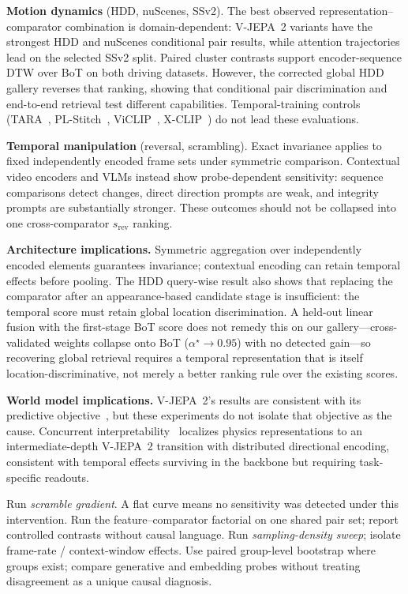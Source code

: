 \documentclass{article}
\theoremstyle{remark}
\begin{document}
\textbf{Motion dynamics} (HDD, nuScenes, SSv2). The best observed representation--comparator combination is domain-dependent: V-JEPA~2 variants have the strongest HDD and nuScenes conditional pair results, while attention trajectories lead on the selected SSv2 split. Paired cluster contrasts support encoder-sequence DTW over BoT on both driving datasets. However, the corrected global HDD gallery reverses that ranking, showing that conditional pair discrimination and end-to-end retrieval test different capabilities. Temporal-training controls (TARA~\cite{tara}, PL-Stitch~\cite{plstitch}, ViCLIP~\cite{viclip}, X-CLIP~\cite{xclip}) do not lead these evaluations.

\textbf{Temporal manipulation} (reversal, scrambling). Exact invariance applies to fixed independently encoded frame sets under symmetric comparison. Contextual video encoders and VLMs instead show probe-dependent sensitivity: sequence comparisons detect changes, direct direction prompts are weak, and integrity prompts are substantially stronger. These outcomes should not be collapsed into one cross-comparator $s_\text{rev}$ ranking.

\textbf{Architecture implications.} Symmetric aggregation over independently encoded elements guarantees invariance; contextual encoding can retain temporal effects before pooling. The HDD query-wise result also shows that replacing the comparator after an appearance-based candidate stage is insufficient: the temporal score must retain global location discrimination. A held-out linear fusion with the first-stage BoT score does not remedy this on our gallery---cross-validated weights collapse onto BoT ($\alpha^\star\!\to\!0.95$) with no detected gain---so recovering global retrieval requires a temporal representation that is itself location-discriminative, not merely a better ranking rule over the existing scores.

\textbf{World model implications.} V-JEPA~2's results are consistent with its predictive objective~\cite{lecun_worldmodel,vjepa2}, but these experiments do not isolate that objective as the cause. Concurrent interpretability~\cite{joseph2026physics} localizes physics representations to an intermediate-depth V-JEPA~2 transition with distributed directional encoding, consistent with temporal effects surviving in the backbone but requiring task-specific readouts.

\begin{algorithm}[h]
\caption{Temporal Sensitivity Diagnostic Protocol}
\label{alg:decision}
\begin{algorithmic}[1]
\State Run \emph{scramble gradient}. A flat curve means no sensitivity was detected under this intervention.
\State Run the feature--comparator factorial on one shared pair set; report controlled contrasts without causal language.
\State Run \emph{sampling-density sweep}; isolate frame-rate / context-window effects.
\State Use paired group-level bootstrap where groups exist; compare generative and embedding probes without treating disagreement as a unique causal diagnosis.
\end{algorithmic}
\end{algorithm}
\end{document}
